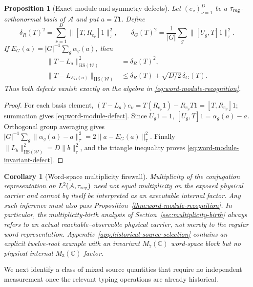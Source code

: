 \documentclass[11pt]{article}
\numberwithin{equation}{section}
\newtheorem{proposition}[theorem]{Proposition}
\newtheorem{corollary}[theorem]{Corollary}
\theoremstyle{definition}
\theoremstyle{remark}
\newcommand{\C}{\mathbb C}
\newcommand{\HS}{\mathrm{HS}}
\newcommand{\norm}[1]{\lVert#1\rVert}
\newcommand{\A}{\mathcal A}
\begin{document}
\begin{proposition}[Exact module and symmetry defects]
\label{prop:word-module-defect}
Let $(e_\nu)_{\nu=1}^D$ be a $\tau_{\rm reg}$-orthonormal basis of $\A$ and
put $a=T1$.  Define
\[
 \delta_R(T)^2=\sum_{\nu=1}^D\norm{[T,R_{e_\nu}]1}_{\tau}^2,
 \qquad
 \delta_G(T)^2=\frac1{|G|}\sum_g\norm{[U_g,T]1}_{\tau}^2.
\]
If $E_G(a)=|G|^{-1}\sum_g\alpha_g(a)$, then
\begin{align}
 \norm{T-L_a}_{\HS(\mathscr W)}^2&=\delta_R(T)^2,
 \label{eq:word-module-defect}\\
 \norm{T-L_{E_G(a)}}_{\HS(\mathscr W)}
 &\le \delta_R(T)+\sqrt{D/2}\,\delta_G(T).
 \label{eq:word-module-invariant-defect}
\end{align}
Thus both defects vanish exactly on the algebra in
\eqref{eq:word-module-recognition}.
\end{proposition}

\begin{proof}
For each basis element,
$(T-L_a)e_\nu=T(R_{e_\nu}1)-R_{e_\nu}T1=[T,R_{e_\nu}]1$; summation gives
\eqref{eq:word-module-defect}.  Since $U_g1=1$,
$[U_g,T]1=\alpha_g(a)-a$.  Orthogonal group averaging gives
$|G|^{-1}\sum_g\norm{\alpha_g(a)-a}_\tau^2=2\norm{a-E_G(a)}_\tau^2$.
Finally $\norm{L_b}_{\HS(\mathscr W)}^2=D\norm b_\tau^2$, and the triangle
inequality proves \eqref{eq:word-module-invariant-defect}.
\end{proof}

\begin{corollary}[Word-space multiplicity firewall]
\label{cor:word-multiplicity-firewall}
Multiplicity of the conjugation representation on $L^2(\A,\tau_{\rm reg})$
need not equal multiplicity on the exposed physical carrier and cannot by
itself be interpreted as an executable internal factor.  Any such inference
must also pass Proposition~\ref{thm:word-module-recognition}.  In particular, the
multiplicity-birth analysis of Section~\ref{sec:multiplicity-birth} always
refers to an actual reachable--observable physical carrier, not merely to the
regular word representation.  Appendix~\ref{app:historical-source-selection}
contains an explicit twelve-root example with an invariant $M_7(\C)$ word-space
block but no physical internal $M_3(\C)$ factor.
\end{corollary}

We next identify a class of mixed source quantities that require no independent
measurement once the relevant typing operations are already historical.
\end{document}
